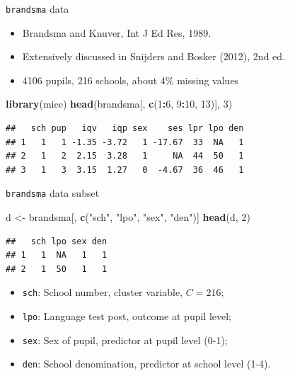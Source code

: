 \documentclass[ignorenonframetext,aspectratio=43]{beamer}
\newenvironment{Shaded}{\begin{snugshade}}{\end{snugshade}}
\newcommand{\DecValTok}[1]{\textcolor[rgb]{0.00,0.00,0.81}{#1}}
\newcommand{\KeywordTok}[1]{\textcolor[rgb]{0.13,0.29,0.53}{\textbf{#1}}}
\newcommand{\NormalTok}[1]{#1}
\newcommand{\OperatorTok}[1]{\textcolor[rgb]{0.81,0.36,0.00}{\textbf{#1}}}
\newcommand{\StringTok}[1]{\textcolor[rgb]{0.31,0.60,0.02}{#1}}
\providecommand{\tightlist}{%
  \setlength{\itemsep}{0pt}\setlength{\parskip}{0pt}}
\begin{document}
\begin{frame}[fragile]{\texttt{brandsma} data}
\protect\hypertarget{brandsma-data}{}

\begin{itemize}
\tightlist
\item
  Brandsma and Knuver, Int J Ed Res, 1989.
\item
  Extensively discussed in Snijders and Bosker (2012), 2nd ed.
\item
  4106 pupils, 216 schools, about 4\% missing values
\end{itemize}

\begin{Shaded}
\begin{Highlighting}[]
\KeywordTok{library}\NormalTok{(mice)}
\KeywordTok{head}\NormalTok{(brandsma[, }\KeywordTok{c}\NormalTok{(}\DecValTok{1}\OperatorTok{:}\DecValTok{6}\NormalTok{, }\DecValTok{9}\OperatorTok{:}\DecValTok{10}\NormalTok{, }\DecValTok{13}\NormalTok{)], }\DecValTok{3}\NormalTok{)}
\end{Highlighting}
\end{Shaded}

\begin{verbatim}
##   sch pup   iqv   iqp sex    ses lpr lpo den
## 1   1   1 -1.35 -3.72   1 -17.67  33  NA   1
## 2   1   2  2.15  3.28   1     NA  44  50   1
## 3   1   3  3.15  1.27   0  -4.67  36  46   1
\end{verbatim}

\end{frame}

\begin{frame}[fragile]{\texttt{brandsma} data subset}
\protect\hypertarget{brandsma-data-subset}{}

\begin{Shaded}
\begin{Highlighting}[]
\NormalTok{d <-}\StringTok{ }\NormalTok{brandsma[, }\KeywordTok{c}\NormalTok{(}\StringTok{"sch"}\NormalTok{, }\StringTok{"lpo"}\NormalTok{, }\StringTok{"sex"}\NormalTok{, }\StringTok{"den"}\NormalTok{)]}
\KeywordTok{head}\NormalTok{(d, }\DecValTok{2}\NormalTok{)}
\end{Highlighting}
\end{Shaded}

\begin{verbatim}
##   sch lpo sex den
## 1   1  NA   1   1
## 2   1  50   1   1
\end{verbatim}

\begin{itemize}
\tightlist
\item
  \texttt{sch}: School number, cluster variable, \(C = 216\);
\item
  \texttt{lpo}: Language test post, outcome at pupil level;
\item
  \texttt{sex}: Sex of pupil, predictor at pupil level (0-1);
\item
  \texttt{den}: School denomination, predictor at school level (1-4).
\end{itemize}

\end{frame}
\end{document}
